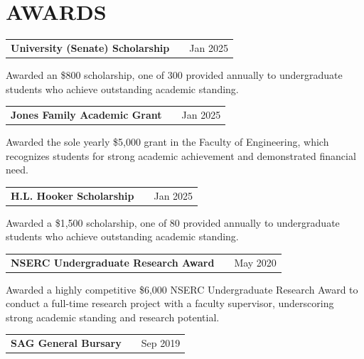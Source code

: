 \documentclass[a4paper,10pt]{article}
\begin{document}
\section{AWARDS}

\begin{tabularx}{\linewidth}{@{}l X r@{}}
\textbf{University (Senate) Scholarship} & \hfill &     Jan 2025
 \end{tabularx}

Awarded an \$800\textbf{ }scholarship, one of 300 provided annually to undergraduate students who achieve outstanding academic standing.


\vspace{6pt}


\begin{tabularx}{\linewidth}{@{}l X r@{}}
\textbf{Jones Family Academic Grant} & \hfill &     Jan 2025
 \end{tabularx}

Awarded the sole yearly \$5,000 grant in the Faculty of Engineering, which recognizes students for strong academic achievement and demonstrated financial need.


\vspace{6pt}


\begin{tabularx}{\linewidth}{@{}l X r@{}}
\textbf{H.L. Hooker Scholarship} & \hfill &     Jan 2025
 \end{tabularx}

Awarded a \$1,500 scholarship, one of 80 provided annually to undergraduate students who achieve outstanding academic standing.
\vspace{6pt}


\begin{tabularx}{\linewidth}{@{}l X r@{}}
\textbf{NSERC Undergraduate Research Award} & \hfill &     May 2020
 \end{tabularx}

Awarded a highly competitive \$6,000 NSERC Undergraduate Research Award to conduct a full-time research project with a faculty supervisor, underscoring strong academic standing and research potential.
\vspace{6pt}


\begin{tabularx}{\linewidth}{@{}l X r@{}}
\textbf{SAG General Bursary} & \hfill &     Sep 2019
 \end{tabularx}
\end{document}
